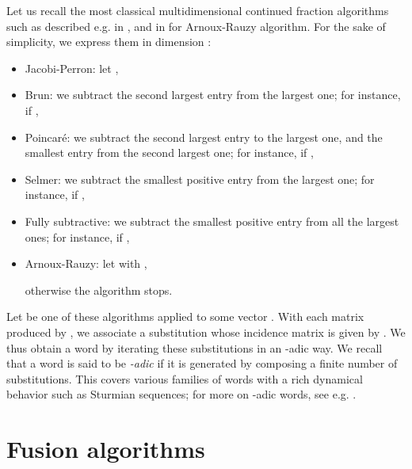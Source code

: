 \documentclass[preliminary,copyright,creativecommons]{eptcs}
\begin{document}
Let us  recall  the most classical multidimensional continued fraction algorithms      such    as  described e.g.  in \cite{schweiger}, and in \cite{CFZ,CFM,WZ} for Arnoux-Rauzy  algorithm.
For the sake of simplicity, we express them  in dimension :
\begin{itemize}


\item   {Jacobi-Perron:}  let 
,

\item   {Brun: }
 we subtract the second largest entry from the largest one;   for instance, if  
   ,  



\item   {Poincar\'e:}  we subtract  the second largest entry to the largest one,  and   the smallest  entry  from the  second largest one; for instance, if 
,



\item   {Selmer: }
 we subtract the smallest  positive entry   from the largest  one;   for instance, if   ,



\item   {Fully subtractive: }
we subtract the smallest   positive entry   from all  the largest  ones;   for instance, if 
  ,


\item {Arnoux-Rauzy:}
let    with  ,

otherwise the algorithm stops.



\end{itemize}
Let   be one of these   algorithms applied to  some vector .
With each matrix  produced by  , we associate  a substitution whose incidence matrix
is given by .   We thus obtain a  word  by iterating these   substitutions in an -adic way.
 We recall that a word  is said to be {\em  -adic}  if it is generated by     composing   a  finite number of substitutions. This covers     various  families of  words
 with a rich   dynamical  behavior such as Sturmian sequences;  for more on -adic words, see  e.g.  \cite{ABFogg,Durand}. 
 









\section{Fusion algorithms}
\end{document}
